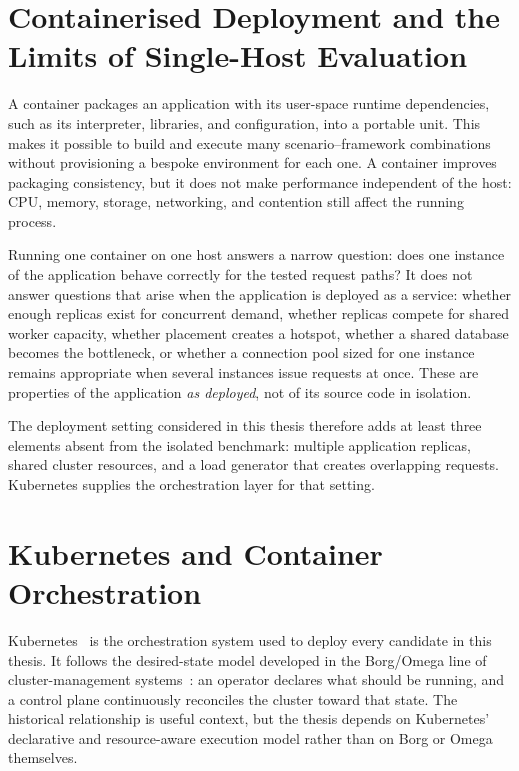 \section{Containerised Deployment and the Limits of Single-Host Evaluation}
\label{sec:background-containerization}

A container packages an application with its user-space runtime dependencies,
such as its interpreter, libraries, and configuration, into a portable unit.
This makes it possible to build and execute many scenario--framework
combinations without provisioning a bespoke environment for each one. A
container improves packaging consistency, but it does not make performance
independent of the host: CPU, memory, storage, networking, and contention
still affect the running process.

Running one container on one host answers a narrow question: does one instance
of the application behave correctly for the tested request paths? It does not
answer questions that arise when the application is deployed as a service:
whether enough replicas exist for concurrent demand, whether replicas compete
for shared worker capacity, whether placement creates a hotspot, whether a
shared database becomes the bottleneck, or whether a connection pool sized
for one instance remains appropriate when several instances issue requests at
once. These are properties of the application \emph{as deployed}, not of its
source code in isolation.

The deployment setting considered in this thesis therefore adds at least
three elements absent from the isolated benchmark: multiple application
replicas, shared cluster resources, and a load generator that creates
overlapping requests. Kubernetes supplies the orchestration layer for that
setting.


\section{Kubernetes and Container Orchestration}
\label{sec:background-kubernetes}

Kubernetes~\cite{kubernetes} is the orchestration system used to deploy every
candidate in this thesis. It follows the desired-state model developed in the
Borg/Omega line of cluster-management systems~\cite{burns2016borg}: an
operator declares what should be running, and a control plane continuously
reconciles the cluster toward that state. The historical relationship is
useful context, but the thesis depends on Kubernetes' declarative and
resource-aware execution model rather than on Borg or Omega themselves.

